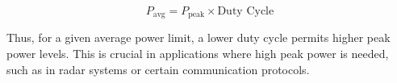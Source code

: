 \[
P_{\text{avg}} = P_{\text{peak}} \times \text{Duty Cycle}
\]

Thus, for a given average power limit, a lower duty cycle permits higher peak power levels. This is crucial in applications where high peak power is needed, such as in radar systems or certain communication protocols.


